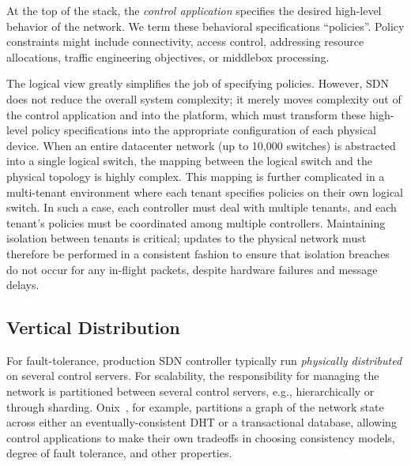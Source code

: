 At the top of the stack, the \emph{control application} specifies the desired
high-level behavior of the network. We term these behavioral specifications
``policies''. Policy constraints might include connectivity, access control,
addressing resource allocations, traffic engineering objectives, or middlebox
processing.

The logical view greatly simplifies the job of specifying policies. However, SDN
does not reduce the overall system complexity; it merely moves complexity out of
the control application and into the platform, which must transform these
high-level policy specifications into the appropriate configuration of each
physical device. When an entire datacenter network (up to 10,000 switches) is
abstracted into a single logical switch, the mapping between the logical switch
and the physical topology is highly complex.
This mapping is further complicated in a multi-tenant environment
\cite{Casado:2010:VNF:1921151.1921162} where each tenant specifies policies on
their own logical switch. In such a case, each controller must deal with
multiple tenants, and each tenant's policies must be coordinated among multiple
controllers. Maintaining isolation between tenants is critical; updates to the
physical network must therefore be performed in a consistent fashion to ensure
that isolation breaches do not occur for any in-flight packets, despite hardware
failures and message delays.

\subsection{Vertical Distribution}

For fault-tolerance, production SDN controller typically run \emph{physically
distributed} on several control servers. For scalability, the responsibility for
managing the network is partitioned between several control servers, e.g.,
hierarchically or through sharding. Onix~\cite{onix}, for example, partitions a
graph of the network state across either an eventually-consistent DHT or a
transactional database, allowing control applications to make their own
tradeoffs in choosing consistency models, degree of fault tolerance, and other
properties.

